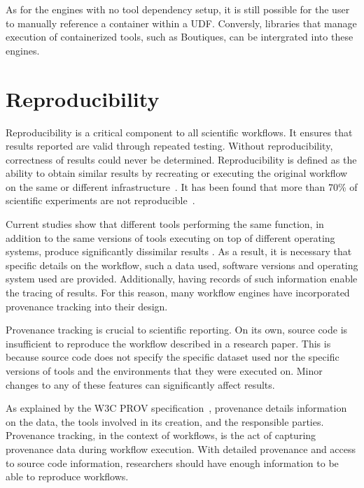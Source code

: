 \documentclass{report}
\begin{document}
            As for the engines with no tool dependency setup, it is still 
            possible for the user to manually reference a container within 
            a UDF. Conversly, libraries that manage execution of containerized 
            tools, such as Boutiques, can be intergrated into these engines.

    \chapter{Reproducibility}\label{reproducibility}
        Reproducibility is a critical component to all scientific workflows.
        It ensures that results reported are valid through repeated testing. 
        Without reproducibility, correctness of results could never be 
        determined. Reproducibility is defined as the ability to obtain similar 
        results by 
        recreating or executing the original workflow on the same or different
        infrastructure~\cite{Peng1226}. It has been found that more than 70\% of
        scientific experiments are not reproducible~\cite{baker2016there}. 

        Current studies show that different tools 
        performing the same function, in addition to the same versions of tools 
        executing on top of different operating systems, produce significantly 
        dissimilar results \cite{bowring:inserm-01760535, 10.1371/journal.pone.0038234, 10.3389/fninf.2015.00012}. 
        As a result, it is necessary that specific details 
        on the workflow, such a data used, software versions and operating 
        system used are provided. Additionally, having records of such information
        enable the tracing of results. For this reason, many workflow engines have
        incorporated provenance tracking into their design.

            Provenance tracking is crucial to scientific reporting.
            On its own, source code is insufficient to reproduce the workflow 
            described in a research paper. This is because source code does 
            not specify the specific dataset used nor the specific versions of
            tools and the environments that they were executed on. Minor 
            changes to any of these features can significantly affect results.

            As explained by the W3C PROV specification~\cite{missier2013w3c}, provenance details 
            information on the data, the tools involved in its creation, and 
            the responsible parties. Provenance tracking, in the context of 
            workflows, is the act of capturing provenance data during
            workflow execution. With detailed provenance and access to source 
            code information, researchers should have enough information to be 
            able to reproduce workflows. 
\end{document}
